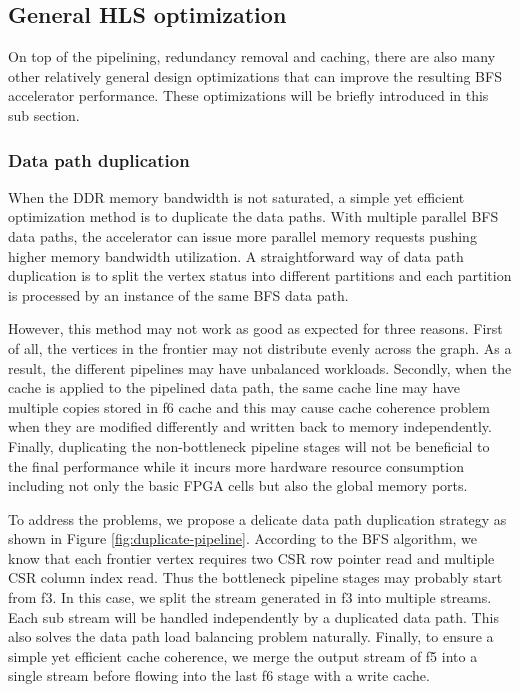 \subsection{General HLS optimization}
On top of the pipelining, redundancy removal and caching, there are also 
many other relatively general design optimizations that can improve the 
resulting BFS accelerator performance. These optimizations will be briefly 
introduced in this sub section.

\subsubsection{Data path duplication}
When the DDR memory bandwidth is not saturated, a simple 
yet efficient optimization method is to duplicate the data paths. 
With multiple parallel BFS data paths, the accelerator can issue more parallel 
memory requests pushing higher memory bandwidth utilization. A straightforward 
way of data path duplication is to split the vertex status into different 
partitions and each partition is processed by an instance of the same BFS data path.

However, this method may not work as good as expected for three reasons. 
First of all, the vertices in the frontier may not distribute evenly across the graph. 
As a result, the different pipelines may have unbalanced workloads. Secondly, 
when the cache is applied to the pipelined data path, the same cache line may 
have multiple copies stored in f6 cache and this may cause 
cache coherence problem when they are modified differently 
and written back to memory independently. Finally, duplicating 
the non-bottleneck pipeline stages will not be beneficial to 
the final performance while it incurs more hardware resource consumption 
including not only the basic FPGA cells but also the global memory ports. 

To address the problems, we propose a delicate data path duplication strategy 
as shown in Figure \ref{fig:duplicate-pipeline}. According to the BFS algorithm, 
we know that each frontier vertex requires two CSR row pointer read and multiple 
CSR column index read. Thus the bottleneck pipeline stages may probably start 
from f3. In this case, we split the stream generated in f3 into 
multiple streams. Each sub stream will be handled independently by a 
duplicated data path. This also solves the data path load balancing problem 
naturally. Finally, to ensure a simple yet efficient cache coherence, we 
merge the output stream of f5 into a single stream before flowing into the 
last f6 stage with a write cache. 

